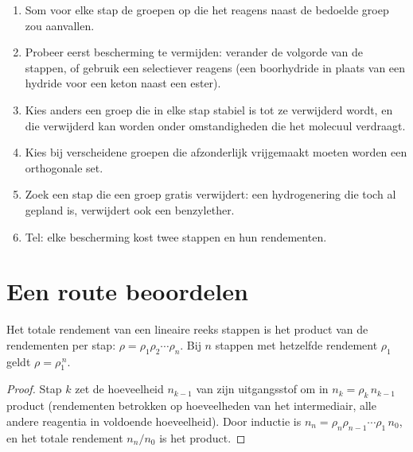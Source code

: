 \begin{method}\label{met:b2:retrosynthesis:protect-in-route}
\begin{enumerate}
  \item Som voor elke stap de groepen op die het reagens naast de bedoelde groep zou aanvallen.
  \item Probeer eerst bescherming te vermijden: verander de volgorde van de stappen, of gebruik een selectiever reagens
        (een boorhydride in plaats van een hydride voor een keton naast een ester).
  \item Kies anders een groep die in elke stap stabiel is tot ze verwijderd wordt, en die verwijderd kan worden onder omstandigheden die het
        molecuul verdraagt.
  \item Kies bij verscheidene groepen die afzonderlijk vrijgemaakt moeten worden een orthogonale set.
  \item Zoek een stap die een groep gratis verwijdert: een hydrogenering die toch al gepland is, verwijdert ook een
        benzylether.
  \item Tel: elke bescherming kost twee stappen en hun rendementen.
\end{enumerate}
\end{method}

\section{Een route beoordelen}\label{sec:b2:retrosynthesis:judging}

\begin{proposition}\label{prop:b2:retrosynthesis:overall-yield}
Het totale rendement van een lineaire reeks stappen is het product van de rendementen per stap:
$\rho = \rho_1 \rho_2 \cdots \rho_n$. Bij $n$ stappen met hetzelfde rendement $\rho_1$ geldt $\rho = \rho_1^{\,n}$.
\end{proposition}

\begin{proof}
Stap $k$ zet de hoeveelheid $n_{k-1}$ van zijn uitgangsstof om in $n_k = \rho_k\, n_{k-1}$ product
(rendementen betrokken op hoeveelheden van het intermediair, alle andere reagentia in voldoende hoeveelheid). Door inductie is
$n_n = \rho_n \rho_{n-1} \cdots \rho_1\, n_0$, en het totale rendement $n_n/n_0$ is het product.
\end{proof}


